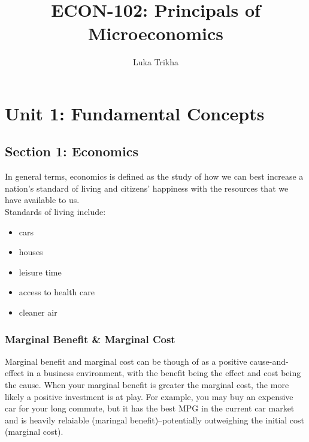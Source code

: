 \documentclass[a4paper, 12pt] {article}
\begin{document}
\title{ECON-102: Principals of Microeconomics}
\author{Luka Trikha}
\maketitle

\section{Unit 1: Fundamental Concepts}
\subsection{Section 1: Economics}
In general terms, economics is defined as the study of how we can best increase
a nation's standard of living and citizens' happiness with the resources that we
have available to us.\\[2mm]
Standards of living include:
\begin{itemize}
    \item cars
    \item houses
    \item leisure time
    \item access to health care
    \item cleaner air
\end{itemize}

\subsubsection{Marginal Benefit \& Marginal Cost}
Marginal benefit and marginal cost can be though of as a positive cause-and-effect
in a business environment, with the benefit being the effect and cost being the
cause. When your marginal benefit is greater the marginal cost, the more likely
a positive investment is at play. For example, you may buy an expensive car for
your long commute, but it has the best MPG in the current car market and is 
heavily relaiable (maringal benefit)--potentially outweighing the initial cost
(marginal cost).
\end{document}
